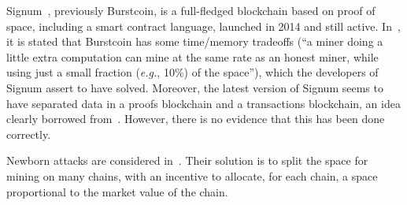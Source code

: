 Signum~\cite{Signum}, previously Burstcoin, is
a full-fledged blockchain based on proof of space, including a smart contract language,
launched in 2014 and still active.
In~\cite{ParkKFGAP18}, it is stated that Burstcoin has some
time/memory tradeoffs (``a miner doing a little extra computation can mine at the same
rate as an honest miner, while using just a small fraction (\emph{e.g.}, 10\%) of the space''),
which the developers of Signum assert to have solved. Moreover, the latest version of Signum
seems to have separated data in a proofs blockchain and a transactions blockchain,
an idea clearly borrowed from~\cite{ParkKFGAP18}. However, there is no evidence that this has been done
correctly.

Newborn attacks are considered in~\cite{TangZDWLG0L19}. Their solution is
to split the space for mining on many chains, with an
incentive to allocate, for each chain, a space proportional
to the market value of the chain.
